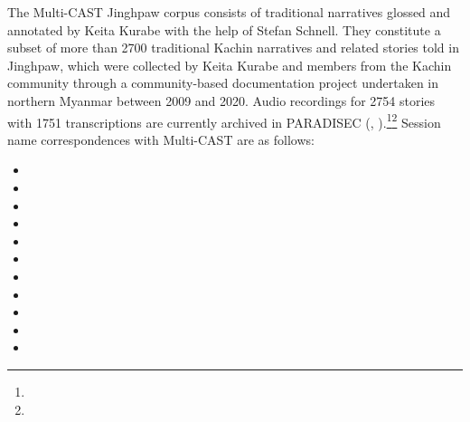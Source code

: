 The Multi-CAST Jinghpaw corpus consists of traditional narratives glossed and annotated by Keita Kurabe with the help of Stefan Schnell. They constitute a subset of more than \num{2700} traditional Kachin narratives and related stories told in Jinghpaw, which were collected by Keita Kurabe and members from the Kachin community through a community-based documentation project undertaken in northern Myanmar between 2009 and 2020. Audio recordings for \num{2754} stories with \num{1751} transcriptions are currently archived in PARADISEC (, ).\footnote{}\footnote{} Session name correspondences with Multi-CAST are as follows:
%
\begin{itemize}
	\TabPositions{5em}
	\item	{}		\tab	{}	\quad	{}		%
	\item	{}		\tab	{}	\quad	{}		%
	\item	{}		\tab	{}	\quad	{}	%
	\item	{}		\tab	{}	\quad	{}				%
	\item	{}		\tab	{}	\quad	{}		%
	\item	{}		\tab	{}	\quad	{}			%
	\item	{}		\tab	{}	\quad	{}		%
	\item	{}		\tab	{}	\quad	{}		%
	\item	{}	\tab	{}	\quad	{}				%
	\item	{}		\tab	{}	\quad	{}			%
	\item	{}	\tab	{}	\quad	{}			%
\end{itemize}


